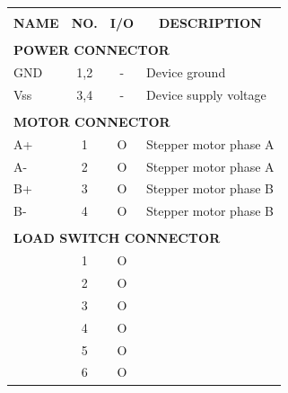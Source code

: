 \documentclass{article}
\begin{document}
\begin{table}[H]
\begin{tabularx}{\textwidth}{|l|c|c|X|}
\hline
\rowcolor{lightgray}
\multicolumn{2}{|c|}{\textbf{PIN}} & &
\\ \hhline{|-|-|>{\arrayrulecolor{lightgray}}-|-|>{\arrayrulecolor{black}}}

\rowcolor{lightgray}
\textbf{NAME} & \textbf{NO.} & \multirow{-2}{*}{\textbf{I/O}} &
\multicolumn{1}{c|}{\multirow{-2}{*}{\textbf{DESCRIPTION}}} \\ \hline

\hline
\multicolumn{4}{|l|}{} \\
\multicolumn{4}{|l|}{\textbf{POWER CONNECTOR}} \\ \hline
GND & 1,2 & - & Device ground \\ \hline
Vss & 3,4 & - & Device supply voltage \\ \hline

\hline
\multicolumn{4}{|l|}{} \\
\multicolumn{4}{|l|}{\textbf{MOTOR CONNECTOR}} \\ \hline
A+ & 1 & O & Stepper motor phase A \\ \hline
A- & 2 & O & Stepper motor phase A \\ \hline
B+ & 3 & O & Stepper motor phase B \\ \hline
B- & 4 & O & Stepper motor phase B \\ \hline

\hline
\multicolumn{4}{|l|}{} \\
\multicolumn{4}{|l|}{\textbf{LOAD SWITCH CONNECTOR}} \\ \hline
 & 1 & O &  \\ \hline
 & 2 & O &  \\ \hline
 & 3 & O &  \\ \hline
 & 4 & O &  \\ \hline
 & 5 & O &  \\ \hline
 & 6 & O &  \\ \hline


\end{tabularx}
\end{table}
\end{document}
